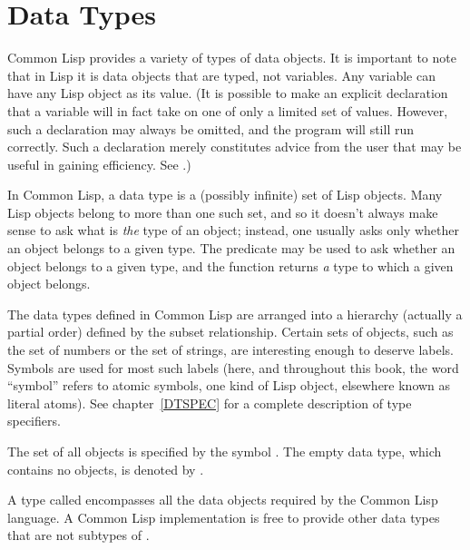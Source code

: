 
\clearpage\def\pagestatus{FINAL PROOF}

\ifx \rulang\Undef

\chapter{Data Types}
\label{DTYPES}

Common Lisp provides a variety of types of data objects.  It is important to
note that in Lisp it is data objects that are typed, not variables.
Any variable can have any Lisp object as its value.
(It is possible to make an explicit declaration that a variable will
in fact take on one of only a limited set of values.  However, such
a declaration may always be omitted, and the program will still run correctly.
Such a declaration merely constitutes advice from the user
that may be useful in gaining efficiency.  See .)

In Common Lisp, a data type is a (possibly infinite) set of
Lisp objects.  Many Lisp objects belong to more than one
such set, and so it doesn't always make sense to ask what is \emph{the} type
of an object; instead, one usually asks only whether an object belongs
to a given type.  The predicate  may be used to ask
whether an object belongs to a given type,
and the function  returns \emph{a} type
to which a given object belongs.

The data types defined in Common Lisp are arranged into a hierarchy (actually
a partial order) defined by the subset relationship.
Certain sets of objects, such as the set of numbers or the
set of strings, are interesting enough to deserve labels.
Symbols are used for most
such labels (here, and throughout this book, the word ``symbol''
refers to atomic symbols, one kind of Lisp object,
elsewhere known as literal atoms).  See chapter~\ref{DTSPEC}
for a complete description of type specifiers.

The set of all objects is specified
by the symbol {\true}.  The empty data type, which contains no objects, is
denoted by {\nil}.

\begin{obsolete}
A type called  encompasses all the data
objects required by the Common Lisp language.  A Common Lisp implementation
is free to provide other data types that are not subtypes of .
\end{obsolete}

